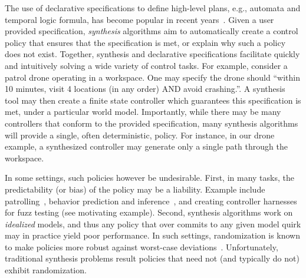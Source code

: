 The use of declarative specifications to define high-level plans, e.g.,
automata and temporal logic formula, has become popular in recent
years~\cite{DBLP:conf/iros/HorowitzWM14, DBLP:conf/rss/WongEK14, DBLP:conf/iros/HeLKV17, DBLP:conf/icra/FuATP16, DBLP:conf/icra/HeWKV19, DBLP:journals/arobots/MoarrefK20, DBLP:conf/icra/KantarosM0P20}.
Given a user provided specification, \emph{synthesis} algorithms aim
to automatically create a control policy that ensures that the
specification is met, or explain why such a policy does not
exist. Together, synthesis and declarative specifications facilitate
quickly and intuitively solving a wide variety of control tasks.  For
example, consider a patrol drone operating in a workspace. One may
specify the drone should ``within 10 minutes, visit 4 locations (in any
order) AND avoid crashing.''. A synthesis tool may then create a
finite state controller which guarantees this specification is met,
under a particular world model.
Importantly, while there may be many controllers that conform to the
provided specification, many synthesis algorithms will provide a
single, often deterministic, policy.  For instance, in our drone
example, a synthesized controller may generate only a single path
through the workspace.

In some settings, such policies however be undesirable.  First, in
many tasks, the predictability (or bias) of the policy may be a
liability.  Example include
patrolling~\cite{DBLP:journals/ior/AlpernMP11}, behavior prediction
and inference~\cite{DBLP:conf/cav/Vazquez-Chanlatte20}, and creating
controller harnesses for fuzz testing (see motivating
example). Second, synthesis algorithms work on \emph{idealized}
models, and thus any policy that over commits to any given model quirk
may in practice yield poor performance. In such settings,
randomization is known to make policies more robust against worst-case
deviations~\cite{mceThesis, maxEntAnswer}. Unfortunately, traditional
synthesis problems result policies that need not (and typically do
not) exhibit randomization.

